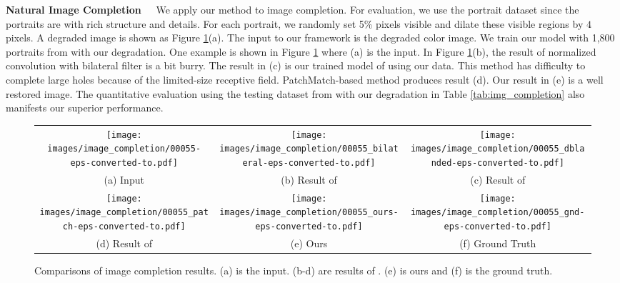 \documentclass[10pt,twocolumn,letterpaper]{article}
\begin{document}
\vspace{0.1in}\noindent\textbf{Natural Image Completion~~} We apply our method to image
completion. For evaluation, we use the portrait dataset \cite{ShenTGZJ16} since the
portraits are with rich structure and details. For each portrait, we randomly set 5\%
pixels visible and dilate these visible regions by $4$ pixels.
A degraded image is shown as Figure \ref{fig:image_completion}(a).
The input to our framework is the degraded color image. We train our
model with 1,800 portraits from \cite{ShenTGZJ16} with our degradation. One example is
shown in Figure \ref{fig:image_completion} where (a) is the input.
In Figure \ref{fig:image_completion}(b), the result of normalized convolution with
bilateral filter \cite{KnutssonW93} is a bit burry. The result in (c) is our trained
model of \cite{RenXYS15} using our data. This method has difficulty to complete large
holes because of the limited-size receptive field. PatchMatch-based method
\cite{KormanA11} produces result (d). Our result in (e) is a well restored image. The
quantitative evaluation using the testing dataset from \cite{ShenTGZJ16} with our
degradation in Table \ref{tab:img_completion} also manifests our superior performance.

\begin{figure}[t]
\centering
\begin{tabular}{@{\hspace{0.0mm}}c@{\hspace{1.0mm}}c@{\hspace{1.0mm}}c@{\hspace{0mm}}}
\texttt{[image: images/image\_completion/00055-eps-converted-to.pdf]}&
\texttt{[image: images/image\_completion/00055\_bilateral-eps-converted-to.pdf]}&
\texttt{[image: images/image\_completion/00055\_dblanded-eps-converted-to.pdf]}\\
\small (a) Input & \small (b) Result of \cite{KnutssonW93}   & \small (c) Result of \cite{RenXYS15} \\
\texttt{[image: images/image\_completion/00055\_patch-eps-converted-to.pdf]}&
\texttt{[image: images/image\_completion/00055\_ours-eps-converted-to.pdf]}&
\texttt{[image: images/image\_completion/00055\_gnd-eps-converted-to.pdf]}\\
\small (d) Result of \cite{KormanA11} & \small (e) Ours & \small (f) Ground Truth \\
\end{tabular}
\caption{Comparisons of image completion results. (a) is the input. (b-d) are results of
\cite{KnutssonW93,RenXYS15,KormanA11}. (e) is ours and (f) is the ground truth. }
\label{fig:image_completion}
\end{figure}
\end{document}
